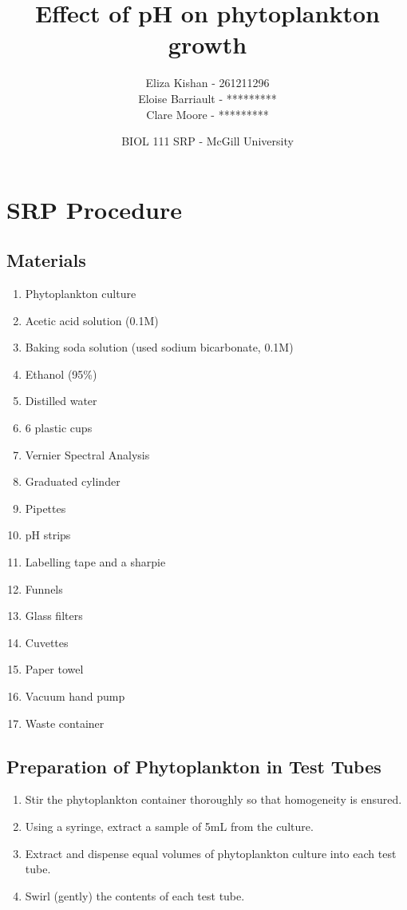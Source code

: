 \documentclass[a4paper]{article}
\title{Effect of pH on phytoplankton growth}
\author{Eliza Kishan - 261211296 \\ Eloise Barriault - ********* \\ Clare Moore - *********}
\date{BIOL 111 SRP - McGill University}
\begin{document}
\maketitle
\section*{SRP Procedure}
\subsection*{Materials}
\begin{enumerate}
    \item Phytoplankton culture
    \item Acetic acid solution (0.1M)
    \item Baking soda solution (used sodium bicarbonate, 0.1M)
    \item Ethanol (95\%)
    \item Distilled water
    \item 6 plastic cups
    \item Vernier Spectral Analysis 
    \item Graduated cylinder
    \item Pipettes
    \item pH strips
    \item Labelling tape and a sharpie
    \item Funnels
    \item Glass filters
    \item Cuvettes
    \item Paper towel
    \item Vacuum hand pump
    \item Waste container
\end{enumerate}

\subsection*{Preparation of Phytoplankton in Test Tubes}
\begin{enumerate}
\item Stir the phytoplankton container thoroughly so that homogeneity is ensured.
\item Using a syringe, extract a sample of 5mL from the culture.
\item Extract and dispense equal volumes of phytoplankton culture into each test tube.
\item Swirl (gently) the contents of each test tube.
\end{enumerate}
\end{document}
